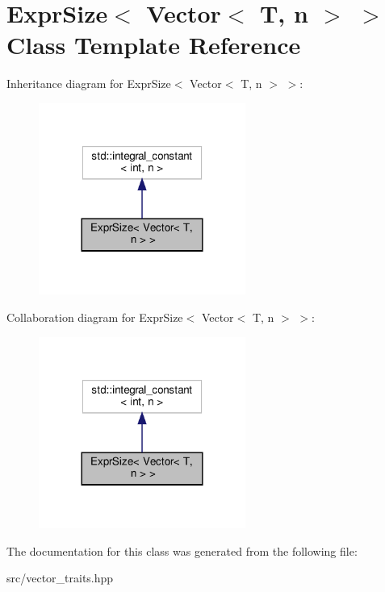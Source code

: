 \hypertarget{classExprSize_3_01Vector_3_01T_00_01n_01_4_01_4}{}\section{Expr\+Size$<$ Vector$<$ T, n $>$ $>$ Class Template Reference}
\label{classExprSize_3_01Vector_3_01T_00_01n_01_4_01_4}


Inheritance diagram for Expr\+Size$<$ Vector$<$ T, n $>$ $>$\+:
\nopagebreak
\begin{figure}[H]
\begin{center}
\leavevmode
\includegraphics[width=192pt]{classExprSize_3_01Vector_3_01T_00_01n_01_4_01_4__inherit__graph}
\end{center}
\end{figure}


Collaboration diagram for Expr\+Size$<$ Vector$<$ T, n $>$ $>$\+:
\nopagebreak
\begin{figure}[H]
\begin{center}
\leavevmode
\includegraphics[width=192pt]{classExprSize_3_01Vector_3_01T_00_01n_01_4_01_4__coll__graph}
\end{center}
\end{figure}


The documentation for this class was generated from the following file\+:\begin{DoxyCompactItemize}
\item 
src/vector\+\_\+traits.\+hpp\end{DoxyCompactItemize}
